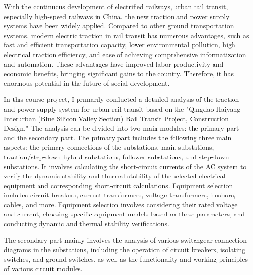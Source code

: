 \begin{enabstract}
With the continuous development of electrified railways, urban rail transit, especially high-speed railways in China, the new traction and power supply systems have been widely applied. Compared to other ground transportation systems, modern electric traction in rail transit has numerous advantages, such as fast and efficient transportation capacity, lower environmental pollution, high electrical traction efficiency, and ease of achieving comprehensive informatization and automation. These advantages have improved labor productivity and economic benefits, bringing significant gains to the country. Therefore, it has enormous potential in the future of social development.

In this course project, I primarily conducted a detailed analysis of the traction and power supply system for urban rail transit based on the "Qingdao-Haiyang Interurban (Blue Silicon Valley Section) Rail Transit Project, Construction Design." The analysis can be divided into two main modules: the primary part and the secondary part. The primary part includes the following three main aspects: the primary connections of the substations, main substations, traction/step-down hybrid substations, follower substations, and step-down substations. It involves calculating the short-circuit currents of the AC system to verify the dynamic stability and thermal stability of the selected electrical equipment and corresponding short-circuit calculations. Equipment selection includes circuit breakers, current transformers, voltage transformers, busbars, cables, and more. Equipment selection involves considering their rated voltage and current, choosing specific equipment models based on these parameters, and conducting dynamic and thermal stability verifications.

The secondary part mainly involves the analysis of various switchgear connection diagrams in the substations, including the operation of circuit breakers, isolating switches, and ground switches, as well as the functionality and working principles of various circuit modules.
\end{enabstract}
\vspace{1em}\par

